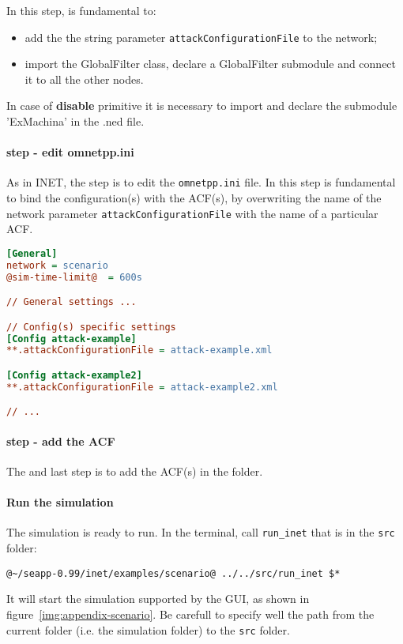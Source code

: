 In this step, is fundamental to:
%
\begin{itemize}
\item add the the string parameter \texttt{attackConfigurationFile} to the network;
\item import the GlobalFilter class, declare a GlobalFilter submodule and connect it to all the other nodes.
\end{itemize}

In case of \textbf{disable} primitive it is necessary to import and declare the submodule 'ExMachina' in the .ned file.   

\paragraph{ step - edit omnetpp.ini}
As in INET, the  step is to edit the \texttt{omnetpp.ini} file. In this step is fundamental to bind the configuration(s) with the ACF(s), by overwriting the name of the network parameter \texttt{attackConfigurationFile} with the name of a particular ACF.
%
\begin{lstlisting}[language={ini}]
[General]
network = scenario
@sim-time-limit@  = 600s

// General settings ...

// Config(s) specific settings
[Config attack-example]
**.attackConfigurationFile = attack-example.xml

[Config attack-example2]
**.attackConfigurationFile = attack-example2.xml

// ...
\end{lstlisting}

\paragraph{ step - add the ACF}
The  and last step is to add the ACF(s) in the folder.

\paragraph{Run the simulation}
The simulation is ready to run. In the terminal, call \texttt{run\_inet} that is in the \texttt{src} folder:
%
\begin{lstlisting}[language={terminal}]
@~/seapp-0.99/inet/examples/scenario@ ../../src/run_inet $*
\end{lstlisting}
%
It will start the simulation supported by the GUI, as shown in figure~\ref{img:appendix-scenario}. Be carefull to specify well the path from the current folder (i.e. the simulation folder) to the \texttt{src} folder. 

